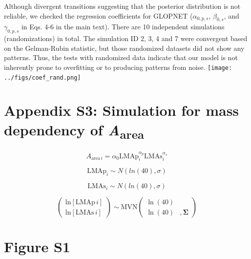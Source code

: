 \documentclass[
  12pt,
  letterpaper,
  DIV=11,
  numbers=noendperiod]{scrartcl}
\begin{document}
Although divergent transitions suggesting that the posterior
distribution is not reliable, we checked the regression coefficients for
GLOPNET (\(\alpha_{0, p, s}\), \(\beta_{0, s}\), and
\(\gamma_{0, p, s}\) in Eqs. 4-6 in the main text). There are 10
independent simulations (randomizations) in total. The simulation ID 2,
3, 4 and 7 were convergent based on the Gelman-Rubin statistic, but
those randomized datasets did not show any patterns. Thus, the tests
with randomized data indicate that our model is not inherently prone to
overfitting or to producing patterns from noise.
\texttt{[image: ../figs/coef\_rand.png]}

\newpage

\hypertarget{appendix-s3-simulation-for-mass-dependency-of-aarea}{%
\section{\texorpdfstring{Appendix S3: Simulation for mass dependency of
\emph{A}\textsubscript{area}}{Appendix S3: Simulation for mass dependency of Aarea}}\label{appendix-s3-simulation-for-mass-dependency-of-aarea}}

\[
A_{\mathrm{area} \, i} = \alpha_0\mathrm{LMAp}_{i}^{\alpha_p}\mathrm{LMAs}_i^{\alpha_s}
\]

\[
\mathrm{LMAp}_{i} \sim N(ln(40), \sigma)
\]

\[
\mathrm{LMAs}_{i} \sim N(ln(40), \sigma)
\]

\[
\left(
\begin{array}{ccc}
\mathrm{ln}[\mathrm{LMAp} \, i]\\
\mathrm{ln}[\mathrm{LMAs} \, i]
\end{array}
\right)
\sim \mathrm{MVN}
\left(
\begin{array}{rrr}
\ln(40)\\
\ln(40) &, \mathbf{\Sigma}
\end{array}
\right) \tag{S3}
\]

\newpage

\hypertarget{figure-s1}{%
\section{Figure S1}\label{figure-s1}}
\end{document}
